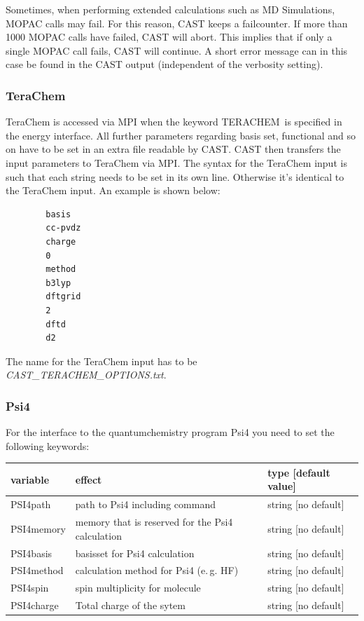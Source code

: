 \documentclass[10pt,a4paper]{article} %
\begin{document}
		Sometimes, when performing extended calculations such as \ac{MD} Simulations, \ac{MOPAC} calls may fail. For this reason, \ac{CAST} keeps a failcounter. If more than 1000 \ac{MOPAC} calls have failed, \ac{CAST} will abort. This implies that if only a single \ac{MOPAC} call fails, \ac{CAST} will continue. A short error message can in this case be found in the \ac{CAST} output (independent of the verbosity setting).
		
		\subsubsection{TeraChem}
		
		
		TeraChem\supercite{terachem} is accessed via \ac{MPI}\supercite{mpi} when the keyword \glqq TERACHEM\grqq~is specified in the energy interface. All further parameters regarding basis set, functional and so on have to be set in an extra file readable by \ac{CAST}. \ac{CAST} then transfers the input parameters to TeraChem via \ac{MPI}. The syntax for the TeraChem input is such that each string needs to be set in its own line. Otherwise it's identical to the TeraChem input. An example is shown below:

		\begin{lstlisting}
		basis
		cc-pvdz
		charge
		0
		method
		b3lyp
		dftgrid
		2
		dftd
		d2\end{lstlisting}

		The name for the TeraChem input has to be \glqq \textit{CAST\_TERACHEM\_OPTIONS.txt}\grqq.
		
		\subsubsection{Psi4}
		
		For the interface to the quantumchemistry program Psi4 you need to set the following keywords:
		
			\begin{longtable}{|p{3cm}|p{5cm}|p{3cm}|}
		variable & effect & type [default value] \\
		\hline
			PSI4path  & path to Psi4 including command & string [no default]\\
			PSI4memory  & memory that is reserved for the Psi4 calculation & string [no default]\\
			PSI4basis & basisset for Psi4 calculation & string [no default]\\
			PSI4method & calculation method for Psi4 (e.\,g. HF) &  string [no default]\\
      PSI4spin & spin multiplicity for molecule & string [no default]\\
			PSI4charge   & Total charge of the sytem &string [no default] \\
		\end{longtable}
	
\end{document}
